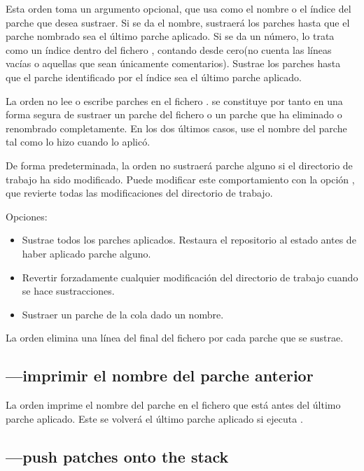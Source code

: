 Esta orden toma un argumento opcional, que usa como el nombre o el
índice del parche que desea sustraer.  Si se da el nombre, sustraerá
los parches hasta que el parche nombrado sea el último parche
aplicado.  Si se da un número,  lo trata como un
índice dentro del fichero ,  contando desde
cero(no cuenta las líneas vacías o aquellas que sean únicamente
comentarios).  Sustrae los parches hasta que el parche identificado
por el índice sea el último parche aplicado.

La orden  no lee o escribe parches en el fichero
.   se constituye por tanto en una
forma segura de sustraer un parche del fichero  o un
parche que ha eliminado o renombrado completamente.  En los dos
últimos casos, use el nombre del parche tal como lo hizo cuando lo
aplicó.

De forma predeterminada, la orden  no sustraerá
parche alguno si el directorio de trabajo ha sido modificado.  Puede
modificar este comportamiento con la opción , que
revierte todas las modificaciones del directorio de trabajo.

Opciones:
\begin{itemize}
\item[\hgxopt{mq}{qpop}{-a}] Sustrae todos los parches aplicados.
  Restaura el repositorio al estado antes de haber aplicado parche alguno.
\item[\hgxopt{mq}{qpop}{-f}] Revertir forzadamente cualquier
  modificación del directorio de trabajo cuando se hace sustracciones.
\item[\hgxopt{mq}{qpop}{-n}] Sustraer un parche de la cola dado un nombre.
\end{itemize}

La orden  elimina una línea del final del fichero
 por cada parche que se sustrae.

\subsection{---imprimir el nombre del parche anterior}

La orden  imprime el nombre del parche en el fichero
 que está antes del último parche aplicado.   Este
se volverá el último parche aplicado si ejecuta .

\subsection{---push patches onto the stack}
\label{sec:mqref:cmd:qpush}

